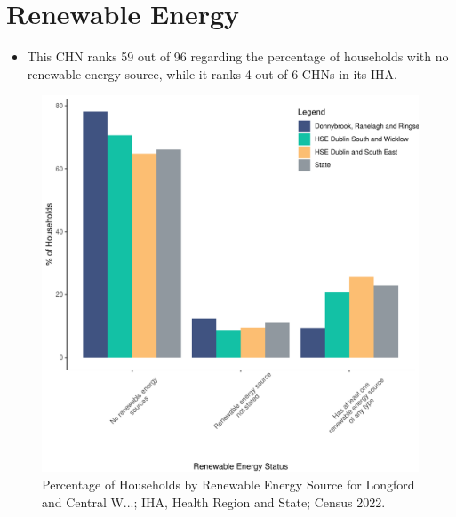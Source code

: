 \documentclass{article}
\begin{document}
\section{Renewable Energy}\label{sect:RE}
\begin{itemize}
\item This CHN ranks  59 out of 96 regarding the percentage of households with no renewable energy source, while it ranks   4 out of 6 CHNs in its IHA.
\end{itemize}
\begin{figure}[H]
	\centering
	\includegraphics[width = 140mm]{../figures/RenewableEnergyED.pdf}
	\caption{Percentage of Households by Renewable Energy Source for Longford and Central W...; IHA, Health Region and State; Census 2022.}
	\label{fig:vbnv}
	\end{figure}
\end{document}
